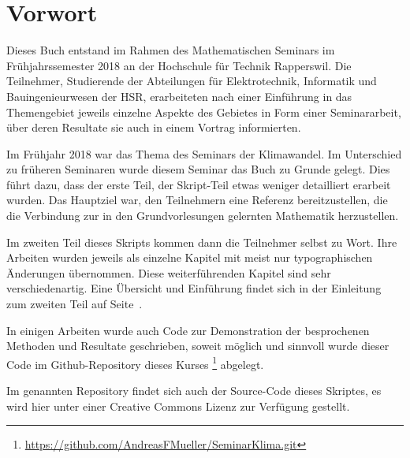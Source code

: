 %
%
%
\chapter*{Vorwort}
\rhead{}
Dieses Buch entstand im Rahmen des Mathematischen Seminars
im Frühjahrssemester 2018 an der Hochschule für Technik Rapperswil.
Die Teilnehmer, Studierende der Abteilungen für Elektrotechnik,
Informatik und Bauingenieurwesen der
HSR, erarbeiteten nach einer Einführung in das Themengebiet jeweils
einzelne Aspekte des Gebietes in Form einer Seminararbeit, über
deren Resultate sie auch in einem Vortrag informierten. 

Im Frühjahr 2018 war das Thema des Seminars der Klimawandel.
Im Unterschied zu früheren Seminaren wurde diesem Seminar das Buch
\cite{skript:kaperengler}
zu Grunde gelegt.
Dies führt dazu, dass der erste Teil, der Skript-Teil etwas weniger
detailliert erarbeit wurden.
Das Hauptziel war, den Teilnehmern eine Referenz bereitzustellen,
die die Verbindung zur in den Grundvorlesungen gelernten
Mathematik herzustellen.

Im zweiten Teil dieses Skripts kommen dann die Teilnehmer selbst zu Wort.
Ihre Arbeiten wurden jeweils als einzelne
Kapitel mit meist nur typographischen Änderungen übernommen.
Diese weiterführenden Kapitel sind sehr verschiedenartig.
Eine Übersicht und Einführung findet sich in der Einleitung
zum zweiten Teil auf Seite~\pageref{skript:uebersicht}.

In einigen Arbeiten wurde auch Code zur Demonstration der 
besprochenen Methoden und Resultate geschrieben, soweit
möglich und sinnvoll wurde dieser Code im Github-Repository
dieses Kurses%
\footnote{\url{https://github.com/AndreasFMueller/SeminarKlima.git}}
\cite{skript:repo}
abgelegt.

Im genannten Repository findet sich auch der Source-Code dieses
Skriptes, es wird hier unter einer Creative Commons Lizenz
zur Verfügung gestellt.




